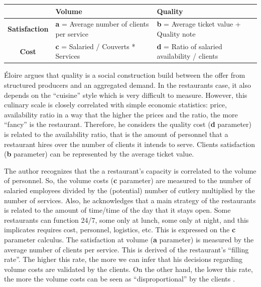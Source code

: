 \documentclass[a4paper, 12pt, openright, oneside, german, french, brazil, english, article]{abntex2}
\begin{document}
        \begin{table}[ht]
         {\begin{tabular}{c | p{5cm} p{5cm}}
         		\hline
            & \textbf{Volume}  & \textbf{Quality} \\
            \hline
            \textbf{Satisfaction}  & \textbf{a} = Average number of clients per service & \textbf{b} = Average ticket value + Quality note \\
            \textbf{Cost} & \textbf{c} = Salaried / Couverts * Services & \textbf{d} = Ratio of salaried availability / clients \\
            \hline
          \end{tabular}
      	}
  		{}
        \end{table}

	Éloire argues that quality is a social construction build between the offer from structured producers and an aggregated demand. In the restaurants case, it also depends on the ``cuisine'' style which is very difficult to measure. However, this culinary scale is closely correlated with simple economic statistics: price, availability ratio in a way that the higher the prices and the ratio, the more ``fancy'' is the restaurant. Therefore, he considers the quality cost (\textbf{d} parameter) is related to the availability ratio, that is the amount of personnel that a restaurant hires over the number of clients it intends to serve. Clients satisfaction (\textbf{b} parameter) can be represented by the average ticket value.

        The author recognizes that the a restaurant's capacity is correlated to the volume of personnel. So, the volume costs (\textbf{c} parameter) are measured to the number of salaried employees divided by the (potential) number of cutlery multiplied by the number of services. Also, he acknowledges that a main strategy of the restaurants is related to the amount of time/time of the day that it stays open. Some restaurants can function 24/7, some only at lunch, some only at night,  and this implicates requires cost, personnel, logistics, etc. This is expressed on the \textbf{c} parameter calculus. The satisfaction at volume (\textbf{a} parameter) is measured by the average number of clients per service. This is derived of the restaurant's ``filling rate''. The higher this rate, the more we can infer that his decisions regarding volume costs are validated by the clients. On the other hand, the lower this rate, the more the volume costs can be seen as ``disproportional'' by the clients \cite{eloire2009reseaux}.
\end{document}
